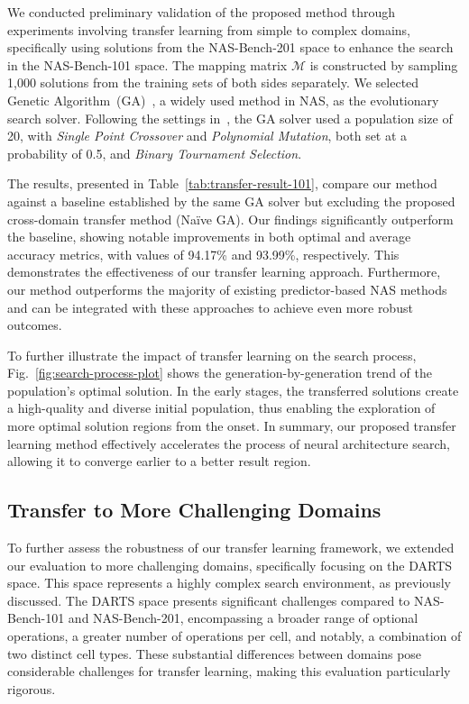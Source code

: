 \documentclass[../main.tex]{subfiles}
\begin{document}
We conducted preliminary validation of the proposed method through experiments involving transfer learning from simple to complex domains, specifically using solutions from the NAS-Bench-201 space to enhance the search in the NAS-Bench-101 space.
The mapping matrix \( \mathcal{M} \) is constructed by sampling 1,000 solutions from the training sets of both sides separately.
We selected Genetic Algorithm~(GA)~\cite{HollandGA1992}, a widely used method in NAS, as the evolutionary search solver.
Following the settings in~\cite{DBLP:conf/iconip/HouDFQ21}, the GA solver used a population size of 20, with \textit{Single Point Crossover} and \textit{Polynomial Mutation}, both set at a probability of 0.5, and \textit{Binary Tournament Selection}.

The results, presented in Table~\ref{tab:transfer-result-101}, compare our method against a baseline established by the same GA solver but excluding the proposed cross-domain transfer method (Na{\"i}ve GA).
Our findings significantly outperform the baseline, showing notable improvements in both optimal and average accuracy metrics, with values of 94.17\% and 93.99\%, respectively. This demonstrates the effectiveness of our transfer learning approach.
Furthermore, our method outperforms the majority of existing predictor-based NAS methods and can be integrated with these approaches to achieve even more robust outcomes.

To further illustrate the impact of transfer learning on the search process, Fig.~\ref{fig:search-process-plot} shows the generation-by-generation trend of the population's optimal solution. In the early stages, the transferred solutions create a high-quality and diverse initial population, thus enabling the exploration of more optimal solution regions from the onset. In summary, our proposed transfer learning method effectively accelerates the process of neural architecture search, allowing it to converge earlier to a better result region.


\subsection{Transfer to More Challenging Domains}

To further assess the robustness of our transfer learning framework, we extended our evaluation to more challenging domains, specifically focusing on the DARTS space.
This space represents a highly complex search environment, as previously discussed.
The DARTS space presents significant challenges compared to NAS-Bench-101 and NAS-Bench-201, encompassing a broader range of optional operations, a greater number of operations per cell, and notably, a combination of two distinct cell types.
These substantial differences between domains pose considerable challenges for transfer learning, making this evaluation particularly rigorous.
\end{document}
